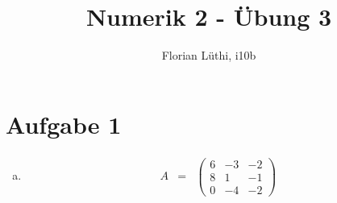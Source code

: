 \documentclass[11pt]{article} %
\title{Numerik 2 - Übung 3}
\author{Florian Lüthi, i10b}
\begin{document}
\maketitle

\section*{Aufgabe 1}

\begin{enumerate}[a)]

\item
\begin{eqnarray*}
A &=& \begin{pmatrix} 6 & -3 & -2 \\ 8 & 1 & -1 \\ 0 & -4 & -2 \end{pmatrix}
\end{eqnarray*}


\end{enumerate}
\end{document}
